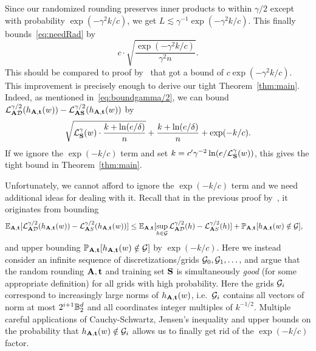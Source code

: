 Since our randomized rounding preserves inner products to within $\gamma/2$ except with probability $\exp(-\gamma^2 k/c)$, we get $L \lesssim \gamma^{-1} \exp(-\gamma^2 k/c)$. This finally bounds~\eqref{eq:needRad} by
\[
c \cdot \sqrt{\frac{\exp(-\gamma^2 k/c)}{\gamma^2 n}}.
\]
This should be compared to proof by~\cite{SVMbest} that got a bound of $c\exp(-\gamma^2 k/c)$. This improvement is precisely enough to derive our tight Theorem~\ref{thm:main}. Indeed, as mentioned in~\eqref{eq:boundgamma/2}, we can bound $\mathcal{L}^{\gamma/2}_{\mathbf{A} \mathcal{D}}(h_{\mathbf{A},\mathbf{t}}(w)) - \mathcal{L}^{\gamma/2}_{\mathbf{A} \mathbf{S}}(h_{\mathbf{A},\mathbf{t}}(w))$ by 
\begin{align*}
\sqrt{\mathcal{L}_{\mathbf{S}}^\gamma(w) \cdot \frac{k + \ln(e/\delta)}{n}} + \frac{k + \ln(e/\delta)}{n} + \exp(-k/c).
\end{align*}
If we ignore the $\exp(-k/c)$ term and set $k = c' \gamma^{-2} \ln(e/\mathcal{L}_{\mathbf{S}}^\gamma(w))$, this gives the tight bound in Theorem~\ref{thm:main}.

Unfortunately, we cannot afford to ignore the $\exp(-k/c)$ term and we need additional ideas for dealing with it. Recall that in the previous proof by~\cite{SVMbest}, it originates from bounding
\begin{align*}
\mathbb{E}_{\mathbf{A},\mathbf{t}}[\mathcal{L}^{\gamma/2}_{\mathbf{A} \mathcal{D}}(h_{\mathbf{A},\mathbf{t}}(w)) -\mathcal{L}^{\gamma/2}_{\mathbf{A} S}(h_{\mathbf{A},\mathbf{t}}(w)) ] &\leq 
\mathbb{E}_{\mathbf{A},\mathbf{t}}[\sup_{h \in \mathcal{G}} \mathcal{L}^{\gamma/2}_{\mathbf{A} \mathcal{D}}(h) -\mathcal{L}^{\gamma/2}_{\mathbf{A} S}(h) ]  + \mathbb{P}_{\mathbf{A},\mathbf{t}}[h_{\mathbf{A},\mathbf{t}}(w) \notin \mathcal{G}],
\end{align*}
and upper bounding $\mathbb{P}_{\mathbf{A},\mathbf{t}}[h_{\mathbf{A},\mathbf{t}}(w) \notin \mathcal{G}]$ by $\exp(-k/c)$. Here we instead consider an infinite sequence of discretizations/grids $\mathcal{G}_0,\mathcal{G}_1,\dots,$ and argue that the random rounding $\mathbf{A}, \mathbf{t}$ and training set $\mathbf{S}$ is simultaneously \emph{good} (for some appropriate definition) for all grids with high probability. Here the grids $\mathcal{G}_i$ correspond to increasingly large norms of $h_{\mathbf{A},\mathbf{t}}(w)$, i.e.\ $\mathcal{G}_i$ contains all vectors of norm at most $2^{i+1} \mathbb{B}_2^d$ and all coordinates integer multiples of $k^{-1/2}$. Multiple careful applications of Cauchy-Schwartz, Jensen's inequality and upper bounds on the probability that $h_{\mathbf{A},\mathbf{t}}(w) \notin \mathcal{G}_i$ allows us to finally get rid of the $\exp(-k/c)$ factor.